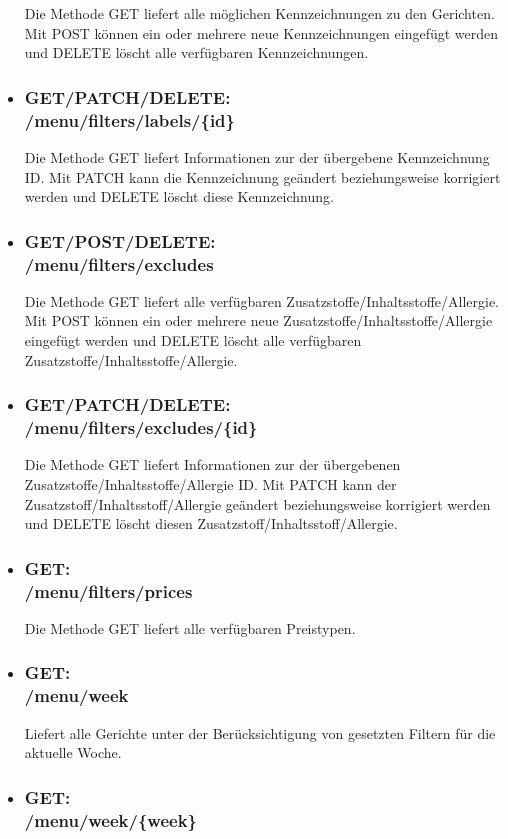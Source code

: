 \begin{itemize}
Die Methode GET liefert alle möglichen Kennzeichnungen zu den Gerichten. Mit POST können ein oder mehrere neue Kennzeichnungen eingefügt werden und DELETE löscht alle verfügbaren Kennzeichnungen.
\item \subsubsection*{GET/PATCH/DELETE:\\ /menu/filters/labels/\{id\}} 
Die Methode GET liefert Informationen zur der übergebene Kennzeichnung ID. Mit PATCH kann die Kennzeichnung geändert beziehungsweise korrigiert werden und DELETE löscht diese Kennzeichnung.
\newpage
\item \subsubsection*{GET/POST/DELETE:\\ /menu/filters/excludes} 
Die Methode GET liefert alle verfügbaren Zusatzstoffe/Inhaltsstoffe/Allergie. Mit POST können ein oder mehrere neue Zusatzstoffe/Inhaltsstoffe/Allergie eingefügt werden und DELETE löscht alle verfügbaren Zusatzstoffe/Inhaltsstoffe/Allergie. 
\item \subsubsection*{GET/PATCH/DELETE:\\ /menu/filters/excludes/\{id\}} 
Die Methode GET liefert Informationen zur der übergebenen Zusatzstoffe/Inhaltsstoffe/Allergie ID. Mit PATCH kann der Zusatzstoff/Inhaltsstoff/Allergie geändert beziehungsweise korrigiert werden und DELETE löscht diesen Zusatzstoff/Inhaltsstoff/Allergie.
\item \subsubsection*{GET:\\ /menu/filters/prices} 
Die Methode GET liefert alle verfügbaren Preistypen.
\item \subsubsection*{GET:\\ /menu/week} 
Liefert alle Gerichte unter der Berücksichtigung von gesetzten Filtern für die aktuelle Woche.
\item \subsubsection*{GET:\\ /menu/week/\{week\}} 

\end{itemize}

